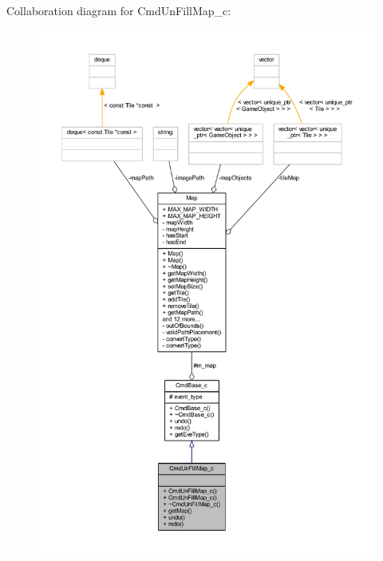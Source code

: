 Collaboration diagram for Cmd\+Un\+Fill\+Map\+\_\+c\+:
\nopagebreak
\begin{figure}[H]
\begin{center}
\leavevmode
\includegraphics[width=350pt]{class_cmd_un_fill_map__c__coll__graph}
\end{center}
\end{figure}

